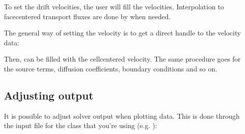 \documentclass[letterpaper,10pt,english]{sphinxmanual}
\begin{document}
\begin{sphinxVerbatim}[commandchars=\\\{\},formatcom=\scriptsize]
         
     
   
        
          
      
\end{sphinxVerbatim}

To set the drift velocities, the user will fill the  velocities.
Interpolation to face\sphinxhyphen{}centered transport fluxes are done by  when needed.

The general way of setting the velocity is to get a direct handle to the velocity data:

\begin{sphinxVerbatim}[commandchars=\\\{\},formatcom=\scriptsize]
 

   
\end{sphinxVerbatim}

Then,  can be filled with the cell\sphinxhyphen{}centered velocity.
The same procedure goes for the source terms, diffusion coefficients, boundary conditions and so on.


\subsection{Adjusting output}
\label{\detokenize{CDR:adjusting-output}}
It is possible to adjust solver output when plotting data.
This is done through the input file for the class that you’re using (e.g. ):
\end{document}
